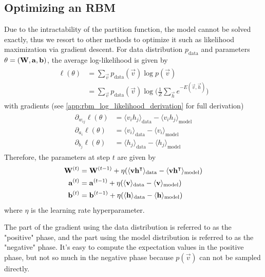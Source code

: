 \subsection{Optimizing an RBM}
Due to the intractability of the partition function, the model cannot be solved exactly, thus we resort to other methods to optimize it such as likelihood maximization via gradient descent.
For data distribution \( p_\text{data} \) and parameters \( \theta = (\mathbf{W}, \mathbf{a}, \mathbf{b}) \), the average log-likelihood is given by
\begin{align}
\begin{split}
    \ell(\theta)
        &= \sum_{\vec{v}} p_{\text{data}}(\vec{v}) \log p(\vec{v}) \\
        &= \sum_{\vec{v}} p_{\text{data}}(\vec{v}) \log \bigg(\frac{1}{Z} \sum_\vec{h} e^{-E(\vec{v},\vec{h})}\bigg)
\end{split}
\end{align}
with gradients (see \cref{app:rbm_log_likelihood_derivation} for full derivation)
\begin{align}
\begin{split}
    \partial_{w_{ij}} \ell(\theta)
        &= \langle v_i h_j \rangle_{\text{data}} - \langle v_i h_j \rangle_{\text{model}} \\
    \partial_{a_i} \ell(\theta)
        &= \langle v_i \rangle_{\text{data}} - \langle v_i \rangle_{\text{model}} \\
    \partial_{b_j} \ell(\theta)
        &= \langle h_j \rangle_{\text{data}} - \langle h_j \rangle_{\text{model}}
\end{split}
\end{align}
Therefore, the parameters at step \( t \) are given by
\begin{align}
\begin{split}
    \mathbf{W}^{(t)}
        &= \mathbf{W}^{(t-1)} + \eta(\langle \mathbf{v} \mathbf{h}^\intercal \rangle_{\text{data}} - \langle \mathbf{v} \mathbf{h}^\intercal \rangle_{\text{model}}) \\
    \mathbf{a}^{(t)}
        &= \mathbf{a}^{(t-1)} + \eta(\langle \mathbf{v} \rangle_{\text{data}} - \langle \mathbf{v} \rangle_{\text{model}}) \\
    \mathbf{b}^{(t)}
        &= \mathbf{b}^{(t-1)} + \eta(\langle \mathbf{h} \rangle_{\text{data}} - \langle \mathbf{h} \rangle_{\text{model}})
\end{split}
\end{align}
where \( \eta \) is the learning rate hyperparameter.

The part of the gradient using the data distribution is referred to as the "positive" phase, and the part using the model distribution is referred to as the "negative" phase.
It's easy to compute the expectation values in the positive phase, but not so much in the negative phase because \( p(\vec{v}) \) can not be sampled directly.

